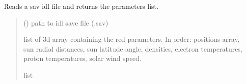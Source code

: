 \documentclass[letterpaper,10pt,english]{sphinxmanual}
\begin{document}

\begin{fulllineitems}
\label{\detokenize{doppler_dimming_lib:doppler_dimming_lib.metis.read_sav_model}}
\pysigstartsignatures
{}
\pysigstopsignatures
\sphinxAtStartPar
Reads a sav idl file and returns the parameters list.
\begin{quote}\begin{description}
\sphinxAtStartPar
{} () \textendash{} path to idl save file (.sav)

\sphinxAtStartPar
list of 3d array containing the red parameters. In order: positions array, sun radial distances, sun latitude angle, densities, electron temperatures, proton temperatures, solar wind speed.

\sphinxAtStartPar
list

\end{description}\end{quote}

\end{fulllineitems}


\begin{fulllineitems}
\label{\detokenize{doppler_dimming_lib:doppler_dimming_lib.metis.resample_ddt_ne}}
\pysigstartsignatures
{}
\pysigstopsignatures
\end{fulllineitems}
\end{document}
